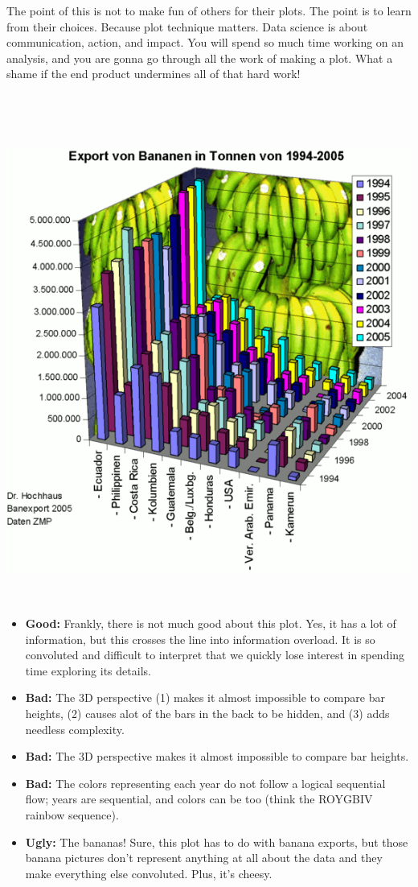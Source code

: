\documentclass[
]{book}
\providecommand{\tightlist}{%
  \setlength{\itemsep}{0pt}\setlength{\parskip}{0pt}}
\begin{document}
The point of this is not to make fun of others for their plots. The point is to learn from their choices. Because plot technique matters. Data science is about communication, action, and impact. You will spend so much time working on an analysis, and you are gonna go through all the work of making a plot. What a shame if the end product undermines all of that hard work!

~

~

\includegraphics{img/vis1.png}

~

\begin{itemize}
\tightlist
\item
  \textbf{Good:} Frankly, there is not much good about this plot. Yes, it has a lot of information, but this crosses the line into information overload. It is so convoluted and difficult to interpret that we quickly lose interest in spending time exploring its details.\\
\item
  \textbf{Bad:} The 3D perspective (1) makes it almost impossible to compare bar heights, (2) causes alot of the bars in the back to be hidden, and (3) adds needless complexity.\\
\item
  \textbf{Bad:} The 3D perspective makes it almost impossible to compare bar heights.
\item
  \textbf{Bad:} The colors representing each year do not follow a logical sequential flow; years are sequential, and colors can be too (think the ROYGBIV rainbow sequence).\\
\item
  \textbf{Ugly:} The bananas! Sure, this plot has to do with banana exports, but those banana pictures don't represent anything at all about the data and they make everything else convoluted. Plus, it's cheesy.
\end{itemize}
\end{document}
